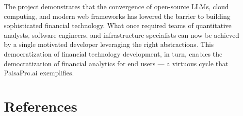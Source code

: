 \documentclass[12pt, a4paper, oneside]{report}
\newcommand{\projectname}{PaisaPro.ai}
\begin{document}
The project demonstrates that the convergence of open-source LLMs, cloud computing, and modern web frameworks has lowered the barrier to building sophisticated financial technology. What once required teams of quantitative analysts, software engineers, and infrastructure specialists can now be achieved by a single motivated developer leveraging the right abstractions. This democratization of financial technology development, in turn, enables the democratization of financial analytics for end users --- a virtuous cycle that \projectname{} exemplifies.


\chapter*{References}
\end{document}

